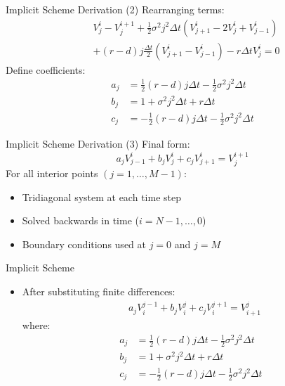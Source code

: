 \documentclass{beamer}
\begin{document}
\begin{frame}{Implicit Scheme Derivation (2)}
    Rearranging terms:
    \begin{align*}
        &V_j^i - V_j^{i+1} + \frac{1}{2}\sigma^2j^2\Delta t(V_{j+1}^i - 2V_j^i + V_{j-1}^i) \\
        &+ (r-d)j\frac{\Delta t}{2}(V_{j+1}^i - V_{j-1}^i) - r\Delta tV_j^i = 0
    \end{align*}
    Define coefficients:
    \begin{align*}
        a_j &= \frac{1}{2}(r-d)j\Delta t - \frac{1}{2}\sigma^2j^2\Delta t \\
        b_j &= 1 + \sigma^2j^2\Delta t + r\Delta t \\
        c_j &= -\frac{1}{2}(r-d)j\Delta t - \frac{1}{2}\sigma^2j^2\Delta t
    \end{align*}
\end{frame}

\begin{frame}{Implicit Scheme Derivation (3)}
    Final form:
    \[a_jV_{j-1}^i + b_jV_j^i + c_jV_{j+1}^i = V_j^{i+1}\]
    For all interior points $(j = 1,\ldots,M-1)$:
    \begin{itemize}
        \item Tridiagonal system at each time step
        \item Solved backwards in time ($i = N-1,\ldots,0$)
        \item Boundary conditions used at $j = 0$ and $j = M$
    \end{itemize}
\end{frame}


\begin{frame}{Implicit Scheme}
    \begin{itemize}
        \item After substituting finite differences:
        \begin{align*}
            &a_j V_{i}^{j-1} + b_j V_{i}^j + c_j V_{i}^{j+1} = V_{i+1}^j
        \end{align*}
        where:
        \begin{align*}
            a_j &= \frac{1}{2}(r-d)j\Delta t - \frac{1}{2}\sigma^2j^2\Delta t \\
            b_j &= 1 + \sigma^2j^2\Delta t + r\Delta t \\
            c_j &= -\frac{1}{2}(r-d)j\Delta t - \frac{1}{2}\sigma^2j^2\Delta t
        \end{align*}
    \end{itemize}
\end{frame}
\end{document}
